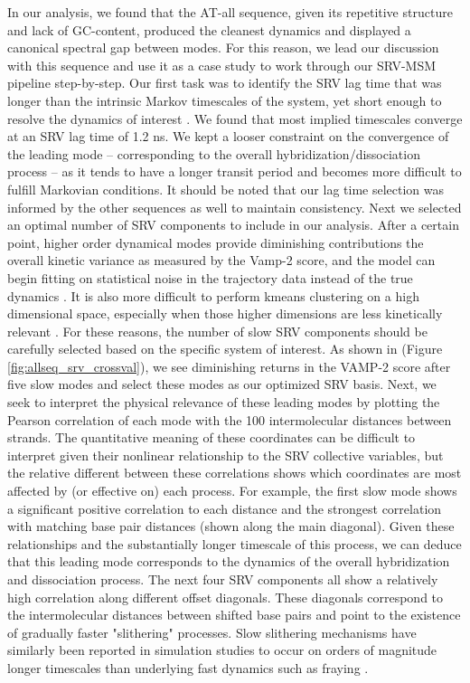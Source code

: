 \documentclass[journal=jpcbfk,manuscript=article]{achemso}
\begin{document}
In our analysis, we found that the AT-all sequence, given its repetitive structure and lack of GC-content, produced the cleanest dynamics and displayed a canonical spectral gap between modes. For this reason, we lead our discussion with this sequence and use it as a case study to work through our SRV-MSM pipeline step-by-step. Our first task was to identify the SRV lag time that was longer than the intrinsic Markov timescales of the system, yet short enough to resolve the dynamics of interest \citep{Phys2018MarkovValidation}. We found that most implied timescales converge at an SRV lag time of 1.2 ns. We kept a looser constraint on the convergence of the leading mode -- corresponding to the overall hybridization/dissociation process -- as it tends to have a longer transit period and becomes more difficult to fulfill Markovian conditions. It should be noted that our lag time selection was informed by the other sequences as well to maintain consistency. Next we selected an optimal number of SRV components to include in our analysis. After a certain point, higher order dynamical modes provide diminishing contributions the overall kinetic variance as measured by the Vamp-2 score, and the model can begin fitting on statistical noise in the trajectory data instead of the true dynamics \citep{McGibbon2015VariationalKinetics}. It is also more difficult to perform kmeans clustering on a high dimensional space, especially when those higher dimensions are less kinetically relevant \citep{Pande2010EverythingAsk}. For these reasons, the number of slow SRV components should be carefully selected based on the specific system of interest. As shown in (Figure \ref{fig:allseq_srv_crossval}), we see diminishing returns in the VAMP-2 score after five slow modes and select these modes as our optimized SRV basis. Next, we seek to interpret the physical relevance of these leading modes by plotting the Pearson correlation of each mode with the 100 intermolecular distances between strands. The quantitative meaning of these coordinates can be difficult to interpret given their nonlinear relationship to the SRV collective variables, but the relative different between these correlations shows which coordinates are most affected by (or effective on) each process. For example, the first slow mode shows a significant positive correlation to each distance and the strongest correlation with matching base pair distances (shown along the main diagonal). Given these relationships and the substantially longer timescale of this process, we can deduce that this leading mode corresponds to the dynamics of the overall hybridization and dissociation process. The next four SRV components all show a relatively high correlation along different offset diagonals. These diagonals correspond to the intermolecular distances between shifted base pairs and point to the existence of gradually faster "slithering" processes. Slow slithering mechanisms have similarly been reported in simulation studies to occur on orders of magnitude longer timescales than underlying fast dynamics such as fraying \citep{Markegard2015, Xiao2019, Maciejczyk2014DNAModel}.
\end{document}

